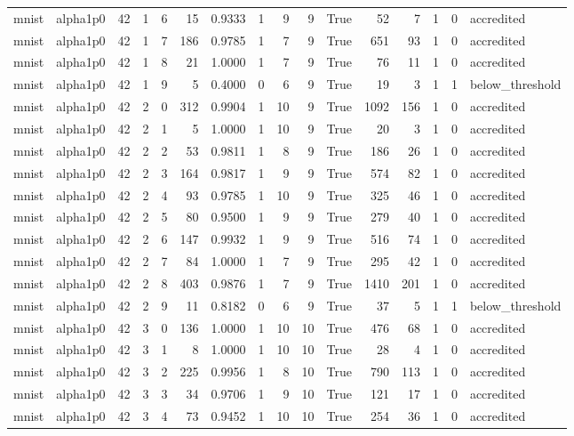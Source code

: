 \begin{tabular}{llrrrrrrrrrrrrrl}
mnist & alpha1p0 & 42 & 1 & 6 & 15 & 0.9333 & 1 & 9 & 9 & True & 52 & 7 & 1 & 0 & accredited \\
mnist & alpha1p0 & 42 & 1 & 7 & 186 & 0.9785 & 1 & 7 & 9 & True & 651 & 93 & 1 & 0 & accredited \\
mnist & alpha1p0 & 42 & 1 & 8 & 21 & 1.0000 & 1 & 7 & 9 & True & 76 & 11 & 1 & 0 & accredited \\
mnist & alpha1p0 & 42 & 1 & 9 & 5 & 0.4000 & 0 & 6 & 9 & True & 19 & 3 & 1 & 1 & below\_threshold \\
mnist & alpha1p0 & 42 & 2 & 0 & 312 & 0.9904 & 1 & 10 & 9 & True & 1092 & 156 & 1 & 0 & accredited \\
mnist & alpha1p0 & 42 & 2 & 1 & 5 & 1.0000 & 1 & 10 & 9 & True & 20 & 3 & 1 & 0 & accredited \\
mnist & alpha1p0 & 42 & 2 & 2 & 53 & 0.9811 & 1 & 8 & 9 & True & 186 & 26 & 1 & 0 & accredited \\
mnist & alpha1p0 & 42 & 2 & 3 & 164 & 0.9817 & 1 & 9 & 9 & True & 574 & 82 & 1 & 0 & accredited \\
mnist & alpha1p0 & 42 & 2 & 4 & 93 & 0.9785 & 1 & 10 & 9 & True & 325 & 46 & 1 & 0 & accredited \\
mnist & alpha1p0 & 42 & 2 & 5 & 80 & 0.9500 & 1 & 9 & 9 & True & 279 & 40 & 1 & 0 & accredited \\
mnist & alpha1p0 & 42 & 2 & 6 & 147 & 0.9932 & 1 & 9 & 9 & True & 516 & 74 & 1 & 0 & accredited \\
mnist & alpha1p0 & 42 & 2 & 7 & 84 & 1.0000 & 1 & 7 & 9 & True & 295 & 42 & 1 & 0 & accredited \\
mnist & alpha1p0 & 42 & 2 & 8 & 403 & 0.9876 & 1 & 7 & 9 & True & 1410 & 201 & 1 & 0 & accredited \\
mnist & alpha1p0 & 42 & 2 & 9 & 11 & 0.8182 & 0 & 6 & 9 & True & 37 & 5 & 1 & 1 & below\_threshold \\
mnist & alpha1p0 & 42 & 3 & 0 & 136 & 1.0000 & 1 & 10 & 10 & True & 476 & 68 & 1 & 0 & accredited \\
mnist & alpha1p0 & 42 & 3 & 1 & 8 & 1.0000 & 1 & 10 & 10 & True & 28 & 4 & 1 & 0 & accredited \\
mnist & alpha1p0 & 42 & 3 & 2 & 225 & 0.9956 & 1 & 8 & 10 & True & 790 & 113 & 1 & 0 & accredited \\
mnist & alpha1p0 & 42 & 3 & 3 & 34 & 0.9706 & 1 & 9 & 10 & True & 121 & 17 & 1 & 0 & accredited \\
mnist & alpha1p0 & 42 & 3 & 4 & 73 & 0.9452 & 1 & 10 & 10 & True & 254 & 36 & 1 & 0 & accredited \\

\end{tabular}
